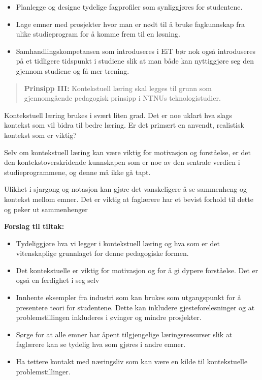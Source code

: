 \begin{itemize}
    \item Planlegge og designe tydelige fagprofiler som synliggjøres for studentene.
	\item Lage emner med prosjekter hvor man er nødt til å bruke fagkunnskap fra ulike studieprogram for å komme frem til en løsning.
	\item Samhandlingskompetansen som introduseres i EiT bør nok også introduseres på et tidligere tidspunkt i studiene slik at man både kan nyttiggjøre seg den gjennom studiene og få mer trening.
\end{itemize}

\begin{quote}
	\textbf{Prinsipp III:} Kontekstuell læring skal legges til grunn som gjennomgående pedagogisk prinsipp i NTNUs teknologistudier.
\end{quote}

Kontekstuell læring brukes i svært liten grad. Det er noe uklart hva slags kontekst som vil bidra til bedre læring. Er det primært en anvendt, realistisk kontekst som er viktig? 

Selv om kontekstuell læring kan være viktig for motivasjon og forståelse, er det den kontekstoverskridende kunnskapen som er noe av den sentrale verdien i studieprogrammene, og denne må ikke gå tapt.

Ulikhet i sjargong og notasjon kan gjøre det vanskeligere å se sammenheng og kontekst mellom emner. Det er viktig at faglærere har et bevist forhold til dette og peker ut sammenhenger

\textbf{Forslag til tiltak:}

\begin{itemize}
	\item Tydeliggjøre hva vi legger i kontekstuell læring og hva som er det vitenskaplige grunnlaget for denne pedagogiske formen.
	\item Det kontekstuelle er viktig for motivasjon og for å gi dypere forståelse. Det er også en ferdighet i seg selv
    \item Innhente eksempler fra industri som kan brukes som utgangspunkt for å presentere teori for studentene. Dette kan inkludere gjesteforelesninger og at problemstillingen inkluderes i øvinger og mindre prosjekter.
	\item Sørge for at alle emner har åpent tilgjengelige læringsressurser slik at faglærere kan se tydelig hva som gjøres i andre emner.
	\item Ha tettere kontakt med næringsliv som kan være en kilde til kontekstuelle problemstillinger.
\end{itemize}

